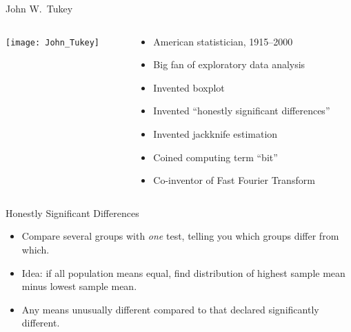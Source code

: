 \documentclass[unknownkeysallowed]{beamer}\usepackage[]{graphicx}\usepackage[]{color}
\begin{document}
\begin{frame}[fragile]{John W.\ Tukey}

  \begin{columns}
    \begin{column}{0.4\textwidth}
      \texttt{[image: John\_Tukey]}
    \end{column}
    \begin{column}{0.6\textwidth}
      \begin{itemize}
      \item American statistician, 1915--2000
      \item Big fan of exploratory data analysis
      \item Invented boxplot
      \item Invented ``honestly significant differences''
      \item Invented jackknife estimation
      \item Coined computing term ``bit''
      \item Co-inventor of Fast Fourier Transform
      \end{itemize}
    \end{column}
  \end{columns}
  
\end{frame}

\begin{frame}[fragile]{Honestly Significant Differences}

  \begin{itemize}
  \item Compare several groups with \emph{one} test, telling you which
    groups differ from which.
  \item Idea: if all population means equal, find distribution of
    highest sample mean minus lowest sample mean.
  \item Any means unusually different compared to that declared
    significantly different.

  \end{itemize}
  
\end{frame}
\end{document}

